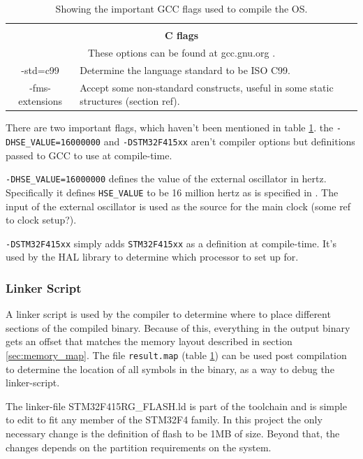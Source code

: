 \begin{table}[H]
\begin{tabular}{|c|p{10cm}|}
		\hline
		\multicolumn{2}{c}{} \\
		\multicolumn{2}{c}{\textbf{C flags}} \\
		\multicolumn{2}{c}{These options can be found at gcc.gnu.org \cite{gcc_c_dialects}.} \\
		\hline
		-std=c99 &
		Determine the language standard to be ISO C99. \\
		\hline
		-fms-extensions &
		Accept some non-standard constructs, useful in some static structures (section ref). \\
		\hline
	\end{tabular}
	\caption{Showing the important GCC flags used to compile the OS.}
	\label{tab:gcc_flags}
\end{table}

There are two important flags, which haven't been mentioned in table \ref{tab:gcc_flags}.
the \texttt{-DHSE\_VALUE=16000000} and \texttt{-DSTM32F415xx} aren't compiler options but definitions passed to GCC to use at compile-time.

\texttt{-DHSE\_VALUE=16000000} defines the value of the external oscillator in hertz.
Specifically it defines \texttt{HSE\_VALUE} to be 16 million hertz as is specified in \cite{hse_value}.
The input of the external oscillator is used as the source for the main clock (some ref to clock setup?).

\texttt{-DSTM32F415xx} simply adds \texttt{STM32F415xx} as a definition at compile-time.
It's used by the HAL library to determine which processor to set up for.

\subsubsection{Linker Script}
\label{ssec:linker_script}
A linker script is used by the compiler to determine where to place different sections of the compiled binary.
Because of this, everything in the output binary gets an offset that matches the memory layout described in section \ref{sec:memory_map}.
The file \texttt{result.map} (table \ref{tab:gcc_flags}) can be used post compilation to determine the location of all symbols in the binary,
as a way to debug the linker-script.

The linker-file STM32F415RG\_FLASH.ld is part of the toolchain and is simple to edit to fit any member of the STM32F4 family.
In this project the only necessary change is the definition of flash to be 1MB of size.
Beyond that, the changes depends on the partition requirements on the system.

